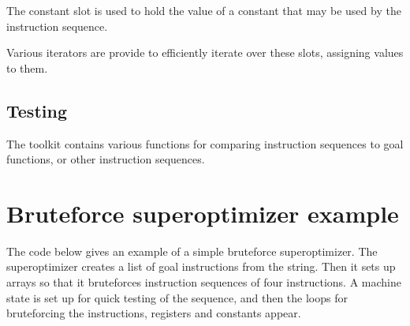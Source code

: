 \documentclass{article}
\begin{document}
The constant slot is used to hold the value of a constant that may be used by the instruction sequence.

Various iterators are provide to efficiently iterate over these slots, assigning values to them.

\subsection{Testing}

The toolkit contains various functions for comparing instruction sequences to goal functions, or other instruction sequences.

\section{Bruteforce superoptimizer example}

The code below gives an example of a simple bruteforce superoptimizer. The superoptimizer creates a list of goal instructions from the string. Then it sets up arrays so that it bruteforces instruction sequences of four instructions. A machine state is set up for quick testing of the sequence, and then the loops for bruteforcing the instructions, registers and constants appear.
\end{document}
